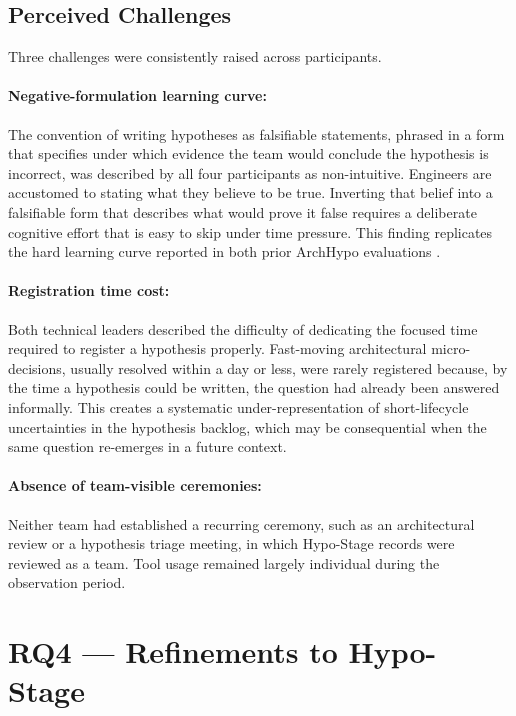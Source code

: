 \subsection{Perceived Challenges}
\label{subsec:challenges}

Three challenges were consistently raised across participants.

\paragraph{Negative-formulation learning curve:}
The convention of writing hypotheses as falsifiable statements, phrased in a
form that specifies under which evidence the team would conclude the hypothesis
is incorrect, was described by all four participants as non-intuitive. Engineers
are accustomed to stating what they believe to be true. Inverting that belief
into a falsifiable form that describes what would prove it false requires a
deliberate cognitive effort that is easy to skip under time pressure. This finding
replicates the hard learning curve reported in both prior ArchHypo evaluations
\citep{silva2024tse, silva2024ieeesw}.

\paragraph{Registration time cost:}
Both technical leaders described the difficulty of dedicating the focused time
required to register a hypothesis properly. Fast-moving architectural micro-decisions, 
usually resolved within a day or less, were rarely registered because, by the time a
hypothesis could be written, the question had already been answered informally.
This creates a systematic under-representation of short-lifecycle uncertainties
in the hypothesis backlog, which may be consequential when the same question
re-emerges in a future context.

\paragraph{Absence of team-visible ceremonies:}
Neither team had established a recurring ceremony, such as an architectural
review or a hypothesis triage meeting, in which Hypo-Stage records were reviewed
as a team. Tool usage remained largely individual during the observation period.

\section{RQ4 — Refinements to Hypo-Stage}
\label{sec:rq4-results}
\label{sec:results-rq4}
\label{sec:refinements}

